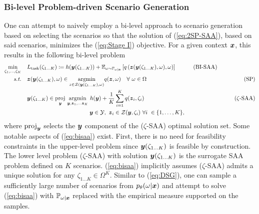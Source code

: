 \subsubsection*{Bi-level Problem-driven Scenario Generation}
One can attempt to naively employ a bi-level approach to scenario generation based on selecting the scenarios so that the solution of (\ref{eq:2SP-SAA}), based on said scenarios, minimizes the (\ref{eq:Stage I}) objective. For a given context $\boldsymbol{x}$, this results in the following bi-level problem
\begin{align}
\min_{\zeta_1, ... ,\zeta_K} \quad & L_{\text{task}}(\zeta_{1 \hdots K}) \coloneq  h( \bs{y}(\zeta_{1...K}))+ \mathbb{E}_{\omega \sim \mathbb{P}_{\omega| \bs{x}}}\left[q \left(\bs{z}(\bs{y}(\zeta_{1...K}), \omega), \omega \right) \right] \quad \tag{BI-SAA} \label{eq:bisaa} \\ \textit{s.t.}  \quad & \bs{z}(\bs{y}(\zeta_{1...K}), \omega) \in \underset{z \in \mathcal{Z}(\bs{y}(\zeta_{1...K}), \omega)}{\text{argmin}} q(\bs{z}, \omega) \quad \forall\  \omega \in \Omega &   \tag{SP} \\
\quad & \bs{y}(\zeta_{1...K}) \in \underset{\bs{y}}{\text{proj}}\  \underset{\bs{y}, \bs{z}_1, ... \bs{z}_K}{\text{argmin}}\  h( \bs{y}) + \frac{1}{K}\sum_{i = 1}^K q(\bs{z}_i, \zeta_i) &  \tag{$\zeta$-SAA}\\
\quad & \hspace{11em}\bs{y} \in \mathcal{Y}, \  \bs{z}_i \in \mathcal{Z}(\bs{y}, \zeta_i) \ \forall i\  \in \{1,\hdots ,K\}, \notag
\end{align}  
where $\text{proj}_{\boldsymbol{y}}$ selects the $\boldsymbol{y}$ component of the \hbox{($\zeta$-SAA)} optimal solution set. Some notable aspects of (\ref{eq:bisaa}) exist. First, there is no need for feasibility constraints in the upper-level problem since $\boldsymbol{y}(\zeta_{1...K})$ is feasible by construction. The lower level problem \hbox{($\zeta$-SAA)} with solution $\boldsymbol{y}(\zeta_{1...K})$ is the surrogate SAA problem defined on $K$ scenarios. (\ref{eq:bisaa}) implicitly assumes \hbox{($\zeta$-SAA)} admits a unique solution for any $\zeta_{1\hdots K} \in \Omega^K$. Similar to (\ref{eq:DSG}), one can sample a sufficiently large number of scenarios from $p_{\theta}(\omega | \boldsymbol{x})$ and attempt to solve (\ref{eq:bisaa}) with $\mathbb{P}_{\omega | \boldsymbol{x}}$ replaced with the empirical measure supported on the samples.


